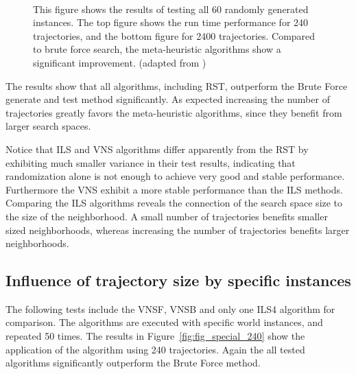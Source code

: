 \begin{figure}[thb]
   \myfloatalign
    \tiny
    \centering
    \\
    \caption[Experiment: All instances]{This figure shows the results of testing all 60 randomly generated instances. The top figure shows the run time performance for 240 trajectories, and the bottom figure for 2400 trajectories. Compared to brute force search, the meta-heuristic algorithms show a significant improvement. (adapted from \cite{myself})}
      \label{fig:fig_allworlds}
   \end{figure}

The results show that all algorithms, including RST, outperform the Brute Force generate and test method significantly. 
As expected increasing the number of trajectories greatly favors the meta-heuristic algorithms, since they benefit from larger search spaces. 

Notice that ILS and VNS algorithms differ apparently from the RST by exhibiting much smaller variance in their test results, indicating that randomization alone is not enough to achieve very good and stable performance.
Furthermore the VNS exhibit a more stable performance than the ILS methods. 
Comparing the ILS algorithms reveals the connection of the search space size to the size of the neighborhood. 
A small number of trajectories benefits smaller sized neighborhoods, whereas increasing the number of trajectories benefits larger neighborhoods. 

\subsection{Influence of trajectory size by specific instances}
The following tests include the VNSF, VNSB and only one ILS4 algorithm for comparison. 
The algorithms are executed with specific world instances, and repeated 50 times. 
The results in Figure~\ref{fig:fig_special_240} show the application of the algorithm using 240 trajectories. Again the all tested algorithms significantly outperform the Brute Force method. 

